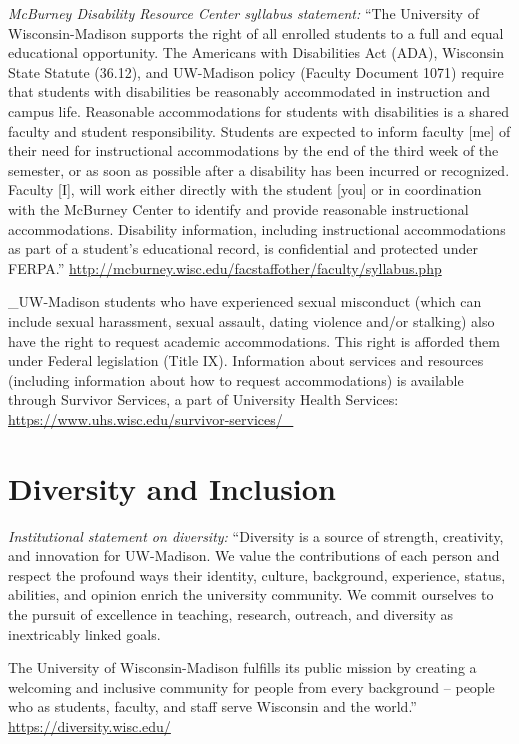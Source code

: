 \documentclass[11pt,man]{article}
\begin{document}
\emph{McBurney Disability Resource Center syllabus statement:} ``The
University of Wisconsin-Madison supports the right of all enrolled
students to a full and equal educational opportunity. The Americans with
Disabilities Act (ADA), Wisconsin State Statute (36.12), and UW-Madison
policy (Faculty Document 1071) require that students with disabilities
be reasonably accommodated in instruction and campus life. Reasonable
accommodations for students with disabilities is a shared faculty and
student responsibility. Students are expected to inform faculty {[}me{]}
of their need for instructional accommodations by the end of the third
week of the semester, or as soon as possible after a disability has been
incurred or recognized. Faculty {[}I{]}, will work either directly with
the student {[}you{]} or in coordination with the McBurney Center to
identify and provide reasonable instructional accommodations. Disability
information, including instructional accommodations as part of a
student's educational record, is confidential and protected under
FERPA.''
\url{http://mcburney.wisc.edu/facstaffother/faculty/syllabus.php}

\_UW-Madison students who have experienced sexual misconduct (which can
include sexual harassment, sexual assault, dating violence and/or
stalking) also have the right to request academic accommodations. This
right is afforded them under Federal legislation (Title IX). Information
about services and resources (including information about how to request
accommodations) is available through Survivor Services, a part of
University Health Services:
\url{https://www.uhs.wisc.edu/survivor-services/_}

\hypertarget{diversity-and-inclusion}{%
\section{Diversity and Inclusion}\label{diversity-and-inclusion}}

\emph{Institutional statement on diversity:} ``Diversity is a source of
strength, creativity, and innovation for UW-Madison. We value the
contributions of each person and respect the profound ways their
identity, culture, background, experience, status, abilities, and
opinion enrich the university community. We commit ourselves to the
pursuit of excellence in teaching, research, outreach, and diversity as
inextricably linked goals.

The University of Wisconsin-Madison fulfills its public mission by
creating a welcoming and inclusive community for people from every
background -- people who as students, faculty, and staff serve Wisconsin
and the world.'' \url{https://diversity.wisc.edu/}
\end{document}

